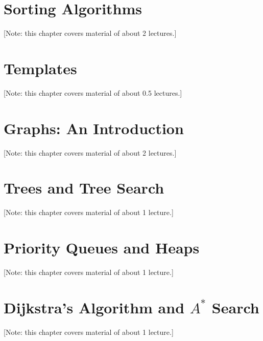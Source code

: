 \documentclass{book}
\begin{document}
\chapter{Sorting Algorithms}
\label{chap:sorting}
[Note: this chapter covers material of about 2 lectures.]

%

\chapter{Templates}
\label{chap:templates}
[Note: this chapter covers material of about 0.5 lectures.]

%

\chapter{Graphs: An Introduction}
\label{chap:graph-basics}
[Note: this chapter covers material of about 2 lectures.]

%

\chapter{Trees and Tree Search}
\label{chap:trees}
[Note: this chapter covers material of about 1 lecture.]

%

\chapter{Priority Queues and Heaps}
\label{chap:priority-queues}
[Note: this chapter covers material of about 1 lecture.]

%

\chapter{Dijkstra's Algorithm and $A^*$ Search}
\label{chap:dijkstra}
[Note: this chapter covers material of about 1 lecture.]

%
\end{document}
